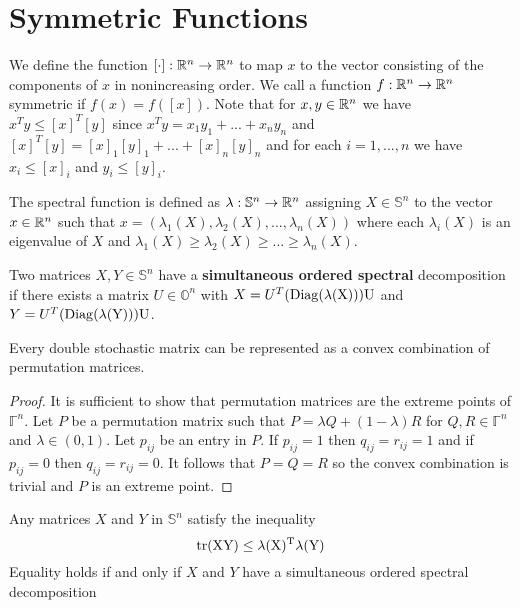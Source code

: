 \chapter{Symmetric Functions}

We define the function $[\cdot]: \Bbb R^n \rightarrow \Bbb R^n$ to map $x$ to the vector consisting of the components of $x$ in nonincreasing order. We call a function $f: \Bbb R^n \rightarrow \Bbb R^n$ symmetric if $f(x) = f([x])$. Note that for $x, y \in \Bbb R^n$ we have $x^T y \leq [x]^T [y]$ since $x^T y = x_1 y_1 + ... + x_n y_n$ and $[x]^T [y] = [x]_1 [y]_1 + ... + [x]_n [y]_n$ and for each $i = 1, ..., n$ we have $x_i \leq [x]_i$ and $y_i \leq [y]_i$.

\begin{definition}
The spectral function is defined as $\lambda: \mathbb{S}^n \rightarrow \Bbb R^n$ assigning $X \in \mathbb{S}^n$ to the vector $x \in \Bbb R^n$ such that $x = (\lambda_1(X), \lambda_2(X), ..., \lambda_n(X))$ where each $\lambda_i(X)$ is an eigenvalue of $X$ and $\lambda_1(X) \geq \lambda_2(X) \geq ... \geq \lambda_n(X)$.
\end{definition}

\begin{definition}
Two matrices $X, Y \in \mathbb{S}^n$ have a \textbf{simultaneous ordered spectral} decomposition if there exists a matrix $U \in \mathbb{O}^n$ with $X = U^T(\rm{Diag}(\lambda(X)))U$ and $Y = U^T(\rm{Diag}(\lambda(Y)))U$.
\end{definition}



\begin{theorem} 
Every double stochastic matrix can be represented as a convex combination of permutation matrices.
\end{theorem}

\begin{proof}
\item It is sufficient to show that permutation matrices are the extreme points of $\mathbb{\Gamma}^n$. Let $P$ be a permutation matrix such that $P = \lambda Q + (1 - \lambda)R$ for $Q, R \in \mathbb{\Gamma}^n$ and $\lambda \in (0, 1)$. Let $p_{ij}$ be an entry in $P$. If $p_{ij} = 1$ then $q_{ij} = r_{ij} = 1$ and if $p_{ij} = 0$ then $q_{ij} = r_{ij} = 0$. It follows that $P = Q = R$ so the convex combination is trivial and $P$ is an extreme point.
\end{proof}

\begin{theorem}
Any matrices $X$ and $Y$ in $\mathbb{S}^n$ satisfy the inequality
\begin{equation*}
\rm{tr}(XY) \leq \lambda(X)^T \lambda(Y)
\end{equation*}
Equality holds if and only if $X$ and $Y$ have a simultaneous ordered spectral decomposition
\end{theorem}

